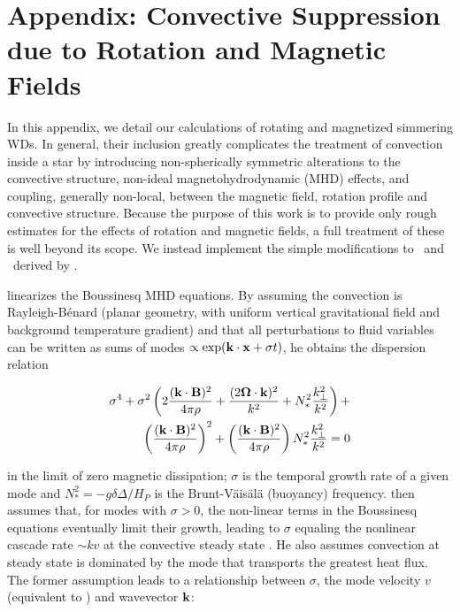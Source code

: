 \section{Appendix: Convective Suppression due to Rotation and Magnetic Fields}
\label{sec:c5_suppression}

In this appendix, we detail our calculations of rotating and magnetized simmering WDs.  In general, their inclusion greatly complicates the treatment of convection inside a star by introducing non-spherically symmetric alterations to the convective structure, non-ideal magnetohydrodynamic (MHD) effects, and coupling, generally non-local, between the magnetic field, rotation profile and convective structure.  Because the purpose of this work is to provide only rough estimates for the effects of rotation and magnetic fields, a full treatment of these is well beyond its scope.  We instead implement the simple modifications to \deltanab\ and \vconv\ derived by \citeal{stev79}.

\citeal{stev79} linearizes the Boussinesq MHD equations.  By assuming the convection is Rayleigh-B\'{e}nard (planar geometry, with uniform vertical gravitational field and background temperature gradient) and that all perturbations to fluid variables can be written as sums of modes $\propto\exp({\bf k}\cdot{\bf x} + \sigma t)$, he obtains the dispersion relation

\begin{eqnarray}
\sigma^4 + \sigma^2\left(2\frac{({\bf k}\cdot{\bf B})^2}{4\pi\rho} + \frac{(2\boldsymbol{\Omega}\cdot{\bf k})^2}{k^2} + N_*^2\frac{k_\perp^2}{k^2}\right) + \nonumber \\
\left(\frac{({\bf k}\cdot{\bf B})^2}{4\pi\rho}\right)^2 + \left(\frac{({\bf k}\cdot{\bf B})^2}{4\pi\rho}\right)N_*^2\frac{k_\perp^2}{k^2} = 0
\label{eq:c5_stev79dispersion}
\end{eqnarray}

\noindent in the limit of zero magnetic dissipation; $\sigma$ is the temporal growth rate of a given mode and $N_*^2 = -g\delta\Delta/H_P$ is the Brunt-V\"{a}is\"{a}l\"{a} (buoyancy) frequency.  \citeal{stev79} then assumes that, for modes with $\sigma > 0$, the non-linear terms in the Boussinesq equations eventually limit their growth, leading to $\sigma$ equaling the nonlinear cascade rate $\sim kv$ at the convective steady state \citep{barkdl14}.  He also assumes convection at steady state is dominated by the mode that transports the greatest heat flux.  The former assumption leads to a relationship between $\sigma$, the mode velocity $v$ (equivalent to \vconv) and wavevector ${\bf k}$:

